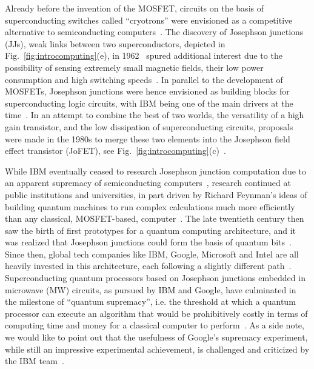 Already before the invention of the MOSFET, circuits on the basis of superconducting switches called \enquote{cryotrons} were envisioned as a competitive alternative to semiconducting computers~\cite{buckCryotronASuperconductiveComputer1956,brockWillNSAFinally}.
%
The discovery of Josephson junctions (JJs), weak links between two superconductors, depicted in Fig.~\ref{fig:introcomputing}(e), in 1962~\cite{josephsonPossibleNewEffects1962,andersonProbableObservationJosephson1963} spured additional interest due to the possibility of sensing extremely small magnetic fields, their low power consumption and high switching speeds~\cite{mcdonaldPicosecondApplicationsJosephson1980}.
%
In parallel to the development of MOSFETs, Josephson junctions were hence envisioned as building blocks for superconducting logic circuits, with IBM being one of the main drivers at the time~\cite{anackerJosephsonComputerTechnology1980a}.
%
In an attempt to combine the best of two worlds, the versatility of a high gain transistor, and the low dissipation of superconducting circuits, proposals were made in the 1980s to merge these two elements into the Josephson field effect transistor (JoFET), see Fig.~\ref{fig:introcomputing}(c)~\cite{clarkFeasibilityHybridJosephson1980,gallagherThreeterminalSuperconductingDevices1985}.


While IBM eventually ceased to research Josephson junction computation due to an apparent supremacy of semiconducting computers~\cite{robinsonIBMDropsSuperconducting1983}, research continued at public institutions and universities, in part driven by Richard Feynman's ideas of building quantum machines to run complex calculations much more efficiently than any classical, MOSFET-based, computer~\cite{feynmanSimulatingPhysicsComputers1982}.
%
The late twentieth century then saw the birth of first prototypes for a quantum computing architecture, and it was realized that Josephson junctions could form the basis of quantum bits~\cite{martinisQuantumJosephsonJunction2020}.
%
Since then, global tech companies like IBM, Google, Microsoft and Intel are all heavily invested in this architecture, each following a slightly different path~\cite{steffenQuantumComputingIBM2011,aruteQuantumSupremacyUsing2019,linnNewMicrosoftBreakthroughs2020,vandersypenQuantumComputingSemiconductor2019}.
%
Superconducting quantum processors based on Josephson junctions embedded in microwave (MW) circuits, as pursued by IBM and Google, have culminated in the milestone of \enquote{quantum supremacy}, i.e. the threshold at which a quantum processor can execute an algorithm that would be prohibitively costly in terms of computing time and money for a classical computer to perform~\cite{aruteQuantumSupremacyUsing2019}.
%
As a side note, we would like to point out that the usefulness of Google's supremacy experiment, while still an impressive experimental achievement, is challenged and criticized by the IBM team~\cite{QuantumSupremacy2019}.




